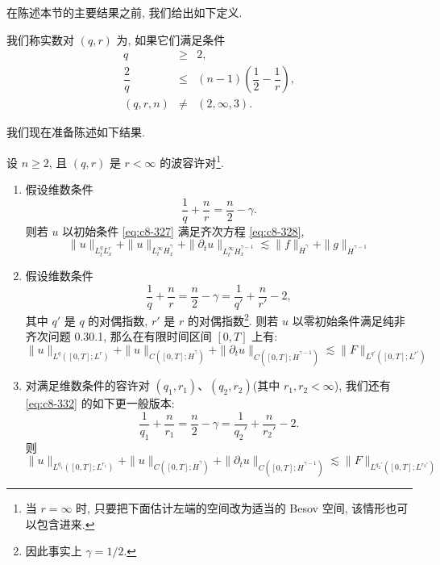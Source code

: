 在陈述本节的主要结果之前, 我们给出如下定义. 

\setcounter{mtthm}{30}

\begin{definition}\label{def:c8-0.31}
我们称实数对 $(q, r)$ 为, 如果它们满足条件
\[
\begin{array}{rcl}
q & \geq & 2, \\[2pt]
\dfrac{2}{q} & \leq & (n-1)\left(\dfrac{1}{2}-\dfrac{1}{r}\right), \\[4pt]
(q, r, n) & \neq & (2, \infty, 3).
\end{array}
\]
\end{definition}

我们现在准备陈述如下结果. 

\begin{theorem}\label{thm:c8-0.32}
设 $n\geq2$, 且 $(q, r)$ 是 $r<\infty$ 的波容许对\footnote{当 $r=\infty$ 时, 只要把下面估计左端的空间改为适当的 Besov 空间, 该情形也可以包含进来. }. 
\begin{enumerate}
\def\labelenumi{(\arabic{enumi})}
\item 假设维数条件
\[
\frac{1}{q}+\frac{n}{r}=\frac{n}{2}-\gamma .
\]
则若 $u$ 以初始条件 \eqref{eq:c8-327} 满足齐次方程 \eqref{eq:c8-328}, 
\begin{equation}
\|u\|_{L_t^q L_x^r}+\|u\|_{L_t^\infty\dot{H}_x^\gamma}+\|\partial_t u\|_{L_t^\infty\dot{H}_x^{\gamma-1}}
\lesssim\|f\|_{\dot{H}^\gamma}+\|g\|_{\dot{H}^{\gamma-1}}\label{eq:c8-331}
\end{equation}
\item 假设维数条件
\[
\frac{1}{q}+\frac{n}{r}=\frac{n}{2}-\gamma=\frac{1}{q'}+\frac{n}{r'}-2, 
\]
其中 $q'$ 是 $q$ 的对偶指数, $r'$ 是 $r$ 的对偶指数\footnote{因此事实上 $\gamma=1/2$. }. 则若 $u$ 以零初始条件满足纯非齐次问题 0.30.1, 那么在有限时间区间 $[0, T]$ 上有:
\begin{equation}
\|u\|_{L^q([0, T];L^r)}+\|u\|_{C([0, T];\dot{H}^\gamma)}+\|\partial_t u\|_{C([0, T];\dot{H}^{\gamma-1})}
\lesssim\|F\|_{L^{q'}([0, T];L^{r'})}\label{eq:c8-332}
\end{equation}
\item 对满足维数条件的容许对 $(q_1, r_1)$、$(q_2, r_2)$(其中 $r_1, r_2<\infty$), 我们还有 \eqref{eq:c8-332} 的如下更一般版本:
\[
\frac{1}{q_1}+\frac{n}{r_1}=\frac{n}{2}-\gamma=\frac{1}{q_2'}+\frac{n}{r_2'}-2 .
\]
则
\begin{equation}
\|u\|_{L^{q_1}([0, T];L^{r_1})}+\|u\|_{C([0, T];\dot{H}^\gamma)}+\|\partial_t u\|_{C([0, T];\dot{H}^{\gamma-1})}
\lesssim\|F\|_{L^{q_2'}([0, T];L^{r_2'})}\label{eq:c8-333}
\end{equation}
\end{enumerate}
\end{theorem}

